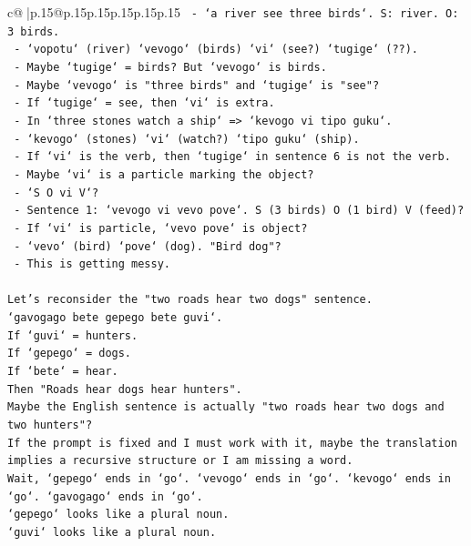 \documentclass{article}
\begin{document}
{\begin{supertabular}{c@{$\;$}|p{.15\linewidth}@{}p{.15\linewidth}p{.15\linewidth}p{.15\linewidth}p{.15\linewidth}p{.15\linewidth}}
{{{\texttt{  {-} `a river see three birds`. S: river. O: 3 birds.} \\
\texttt{  {-} `vopotu` (river) `vevogo` (birds) `vi` (see?) `tugige` (??).} \\
\texttt{  {-} Maybe `tugige` = birds? But `vevogo` is birds.} \\
\texttt{  {-} Maybe `vevogo` is "three birds" and `tugige` is "see"?} \\
\texttt{  {-} If `tugige` = see, then `vi` is extra.} \\
\texttt{  {-} In `three stones watch a ship` => `kevogo vi tipo guku`.} \\
\texttt{  {-} `kevogo` (stones) `vi` (watch?) `tipo guku` (ship).} \\
\texttt{  {-} If `vi` is the verb, then `tugige` in sentence 6 is not the verb.} \\
\texttt{  {-} Maybe `vi` is a particle marking the object?} \\
\texttt{  {-} `S O vi V`?} \\
\texttt{  {-} Sentence 1: `vevogo vi vevo pove`. S (3 birds) O (1 bird) V (feed)?} \\
\texttt{    {-} If `vi` is particle, `vevo pove` is object?} \\
\texttt{    {-} `vevo` (bird) `pove` (dog). "Bird dog"?} \\
\texttt{    {-} This is getting messy.} \\
\\ 
\texttt{Let's reconsider the "two roads hear two dogs" sentence.} \\
\texttt{`gavogago bete gepego bete guvi`.} \\
\texttt{If `guvi` = hunters.} \\
\texttt{If `gepego` = dogs.} \\
\texttt{If `bete` = hear.} \\
\texttt{Then "Roads hear dogs hear hunters".} \\
\texttt{Maybe the English sentence is actually "two roads hear two dogs and two hunters"?} \\
\texttt{If the prompt is fixed and I must work with it, maybe the translation implies a recursive structure or I am missing a word.} \\
\texttt{Wait, `gepego` ends in `go`. `vevogo` ends in `go`. `kevogo` ends in `go`. `gavogago` ends in `go`.} \\
\texttt{`gepego` looks like a plural noun.} \\
\texttt{`guvi` looks like a plural noun.} \\
}}}
\end{supertabular}}
\end{document}
